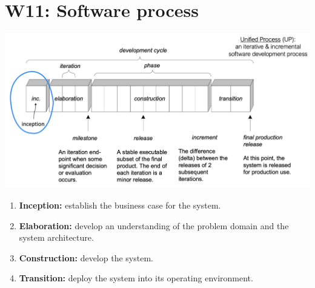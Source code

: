 \section{W11: Software process}
\includegraphics[width=\linewidth]{figs/unified-process.png}
\begin{enumerate}
    \item \textbf{Inception:} establish the business case for the system.
    \item \textbf{Elaboration:} develop an understanding of the problem domain and the system architecture.
    \item \textbf{Construction:} develop the system.
    \item \textbf{Transition:} deploy the system into its operating environment.
\end{enumerate}
